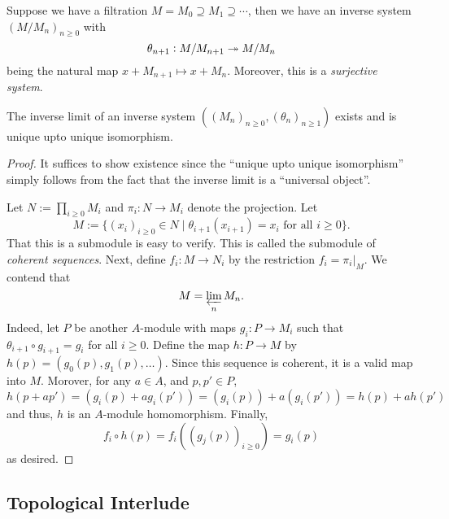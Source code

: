 \begin{example}
    Suppose we have a filtration $M = M_0\supseteq M_1\supseteq\cdots$, then we have an inverse system $(M/M_n)_{n\ge 0}$ with 
    \begin{equation*}
        \theta_{n + 1}: M/M_{n + 1}\twoheadrightarrow M/M_n
    \end{equation*}
    being the natural map $x + M_{n + 1}\mapsto x + M_n$. Moreover, this is a \emph{surjective system}.
\end{example}

\begin{proposition}
    The inverse limit of an inverse system $((M_n)_{n\ge 0}, (\theta_n)_{n\ge1})$ exists and is unique upto unique isomorphism.
\end{proposition}
\begin{proof}
    It suffices to show existence since the ``unique upto unique isomorphism'' simply follows from the fact that the inverse limit is a ``universal object''.

    Let $N := \prod_{i\ge 0} M_i$ and $\pi_i: N\to M_i$ denote the projection. Let 
    \begin{equation*}
        M := \{(x_i)_{i\ge 0}\in N\mid \theta_{i + 1}(x_{i + 1}) = x_i\text{ for all }i\ge 0\}.
    \end{equation*}
    That this is a submodule is easy to verify. This is called the submodule of \emph{coherent sequences}. Next, define $f_i: M\to N_i$ by the restriction $f_i = \pi_i|_M$. We contend that 
    \begin{equation*}
        M = \varprojlim_n M_n.
    \end{equation*}
    Indeed, let $P$ be another $A$-module with maps $g_i: P\to M_i$ such that $\theta_{i + 1}\circ g_{i + 1} = g_{i}$ for all $i\ge 0$. Define the map $h: P\to M$ by $h(p) = (g_0(p),g_1(p),\dots)$. Since this sequence is coherent, it is a valid map into $M$. Morover, for any $a\in A$, and $p,p'\in P$,
    \begin{equation*}
        h(p + ap') = (g_i(p) + ag_i(p')) = (g_i(p)) + a(g_i(p')) = h(p) + ah(p')
    \end{equation*}
    and thus, $h$ is an $A$-module homomorphism. Finally, 
    \begin{equation*}
        f_i\circ h(p) = f_i((g_j(p))_{i\ge 0}) = g_i(p)
    \end{equation*}
    as desired.
\end{proof}

\subsection*{Topological Interlude}

